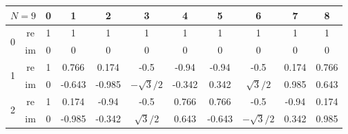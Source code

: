\begin{center}
	\begin{tabular}{| c c c c c c c c c c c |}
		\hline
		\multicolumn{2}{|c}{$N=9$} & \multicolumn{1}{c}{ \tiny 0} & \multicolumn{1}{c}{ \tiny 1} & \multicolumn{1}{c}{ \tiny 2} & \multicolumn{1}{c}{ \tiny 3} & \multicolumn{1}{c}{ \tiny 4} & \multicolumn{1}{c}{ \tiny 5} & \multicolumn{1}{c}{ \tiny 6} & \multicolumn{1}{c}{ \tiny 7} & \multicolumn{1}{c|}{ \tiny 8}                 \\
		\hline
		\hline
		\multirow{2}{*}{0}         & re                           & 1                            & 1                            & 1                            & 1                            & 1                            & 1                            & 1                            & 1                             & 1             \\
		                           & im                           & 0                            & 0                            & 0                            & 0                            & 0                            & 0                            & 0                            & 0                             & 0             \\
		\hline\hline
		\multirow{2}{*}{1}         & re                           & 1                            & 0.766                        & 0.174                        & -0.5                         & -0.94                        & -0.94                        & -0.5                         & 0.174                         & 0.766         \\
		                           & im                           & 0                            & -0.643                       & -0.985                       & $-\sqrt{3}/2$                & -0.342                       & 0.342                        & $\sqrt{3}/2$                 & 0.985                         & 0.643         \\
		\hline\hline
		\multirow{2}{*}{2}         & re                           & 1                            & 0.174                        & -0.94                        & -0.5                         & 0.766                        & 0.766                        & -0.5                         & -0.94                         & 0.174         \\
		                           & im                           & 0                            & -0.985                       & -0.342                       & $\sqrt{3}/2$                 & 0.643                        & -0.643                       & $-\sqrt{3}/2$                & 0.342                         & 0.985         \\

\end{tabular}
\end{center}
